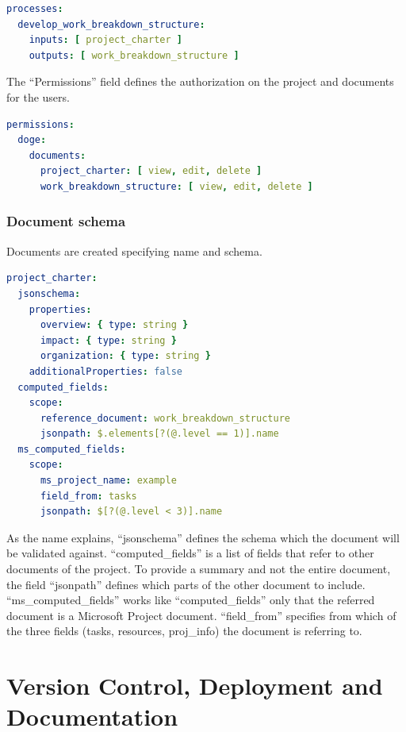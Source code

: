 \documentclass[12pt]{report}
\begin{document}
\begin{lstlisting}[language=yaml, caption=Processes field in Project creation schema]
processes:
  develop_work_breakdown_structure:
    inputs: [ project_charter ]
    outputs: [ work_breakdown_structure ]
\end{lstlisting}

The “Permissions” field defines the authorization on the project and documents for the users.

\begin{lstlisting}[language=yaml, caption=Permissions field in Project creation schema]
permissions:
  doge:
    documents:
      project_charter: [ view, edit, delete ]
      work_breakdown_structure: [ view, edit, delete ]
\end{lstlisting}

\subsection{Document schema}

Documents are created specifying name and schema.

\begin{lstlisting}[language=yaml, caption=Document creation schema]
project_charter:
  jsonschema:
    properties:
      overview: { type: string }
      impact: { type: string }
      organization: { type: string }
    additionalProperties: false
  computed_fields:
    scope:
      reference_document: work_breakdown_structure
      jsonpath: $.elements[?(@.level == 1)].name
  ms_computed_fields:
    scope:
      ms_project_name: example
      field_from: tasks
      jsonpath: $[?(@.level < 3)].name
\end{lstlisting}

As the name explains, “jsonschema” defines the schema which the document will be validated against.
“computed\_fields” is a list of fields that refer to other documents of the project. To provide a summary and not the entire document, the field “jsonpath” defines which parts of the other document to include.
“ms\_computed\_fields” works like “computed\_fields” only that the referred document is a Microsoft Project document. “field\_from” specifies from which of the three fields (tasks, resources, proj\_info) the document is referring to.

\chapter{Version Control, Deployment and Documentation}
\end{document}
